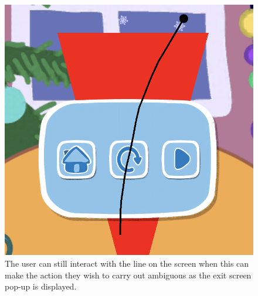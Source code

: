 \documentclass[11pt]{article}
\begin{document}
                \begin{figure}[!ht]
                        \begin{minipage}{0.32\textwidth}
                            \centering \includegraphics[width=0.8\linewidth]{Images/peppa/peppaGlitchLine.PNG}
                            \caption{The user can still interact with the line on the screen when this can make the action they wish to carry out ambiguous as the exit screen pop-up is displayed.}
                            \label{fig:peppaGlitchLine}
                        \end{minipage}
                        \begin{minipage}{0.32\textwidth}
                            \centering

\end{minipage}
\end{figure}
\end{document}
